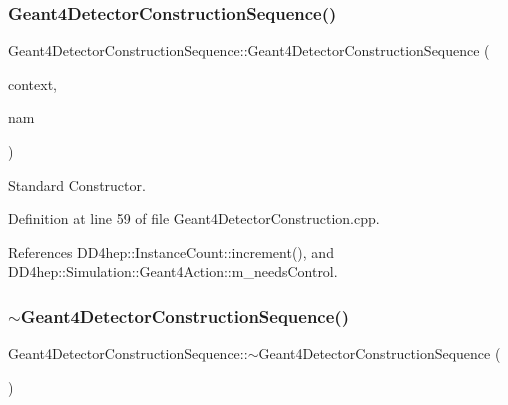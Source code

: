 \subsubsection{\texorpdfstring{Geant4\+Detector\+Construction\+Sequence()}{Geant4DetectorConstructionSequence()}}
{\footnotesize\ttfamily Geant4\+Detector\+Construction\+Sequence\+::\+Geant4\+Detector\+Construction\+Sequence (\begin{DoxyParamCaption}\item[{\hyperlink{class_d_d4hep_1_1_simulation_1_1_geant4_context}{Geant4\+Context} $\ast$}]{context,  }\item[{const std\+::string \&}]{nam }\end{DoxyParamCaption})}



Standard Constructor. 



Definition at line 59 of file Geant4\+Detector\+Construction.\+cpp.



References D\+D4hep\+::\+Instance\+Count\+::increment(), and D\+D4hep\+::\+Simulation\+::\+Geant4\+Action\+::m\+\_\+needs\+Control.

\hypertarget{class_d_d4hep_1_1_simulation_1_1_geant4_detector_construction_sequence_a417d49c67bf4903def46532f17dd7d20}{}\label{class_d_d4hep_1_1_simulation_1_1_geant4_detector_construction_sequence_a417d49c67bf4903def46532f17dd7d20} 
\subsubsection{\texorpdfstring{$\sim$\+Geant4\+Detector\+Construction\+Sequence()}{~Geant4DetectorConstructionSequence()}}
{\footnotesize\ttfamily Geant4\+Detector\+Construction\+Sequence\+::$\sim$\+Geant4\+Detector\+Construction\+Sequence (\begin{DoxyParamCaption}{ }\end{DoxyParamCaption})\hspace{0.3cm}{\ttfamily [virtual]}}



